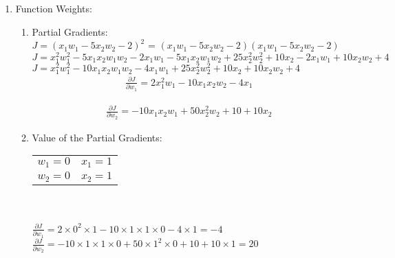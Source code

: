 \documentclass[12pt]{article}
\begin{document}
\begin{enumerate}
\begin{enumerate}
	\end{enumerate}
	
	\begin{comment}
	\newpage
		\end{comment}


	\item Function Weights:\\
	
	\begin{enumerate}
	
	\item Partial Gradients:\\
	
	$J=(x_1 w_1 -5x_2 w_2-2)^2$ = $(x_1 w_1 -5x_2 w_2-2)$$(x_1 w_1 -5x_2 w_2-2)$\\
	$J=x_1^{2}w_1^{2} - 5x_{1}x_{2}w_{1}w_{2}-2x_{1}w_{1}-5x_{1}x_{2}w_{1}w_{2} + 25x_2^{2}w_2^{2} + 10x_2-2x_{1}w_{1} +10x_{2}w_{2} + 4$\\
	$J=x_1^{2}w_1^{2} - 10x_{1}x_{2}w_{1}w_{2} -4x_{1}w_{1} + 25x_2^{2}w_2^{2} + 10x_2 +10x_{2}w_{2} + 4$\\
	
	
	\begin{equation}
		\begin{split}
			\frac{\partial J}{\partial w_1} = 2x_1^{2}w_1 - 10x_{1}x_{2}w_{2} - 4x_{1}
		\end{split}
	\end{equation}

	\begin{equation}
		\begin{split}
			\frac{\partial J}{\partial w_2} = -10x_{1}x_{2}w_{1} + 50x_2^{2}w_2 + 10 + 10x_2
		\end{split}
	\end{equation}
	
	\item Value of the Partial Gradients:\\
	
	\begin{tabular}{ c c}
		$w_1 = 0$ & $x_1 = 1$\\ 
		$w_2 = 0$ & $x_2 = 1$ 
	\end{tabular}\\
\\
	
	$\frac{\partial J}{\partial w_1} = 2 \times 0^2 \times 1 - 10 \times 1 \times 1 \times 0 - 4 \times 1 = -4$\\
	$\frac{\partial J}{\partial w_2} = - 10 \times 1 \times 1 \times 0 + 50 \times 1^2 \times 0 + 10 + 10 \times 1 = 20$\\
	

	\end{enumerate}

	
	\begin{comment}

	\end{comment}
	

\end{enumerate}
\end{document}

